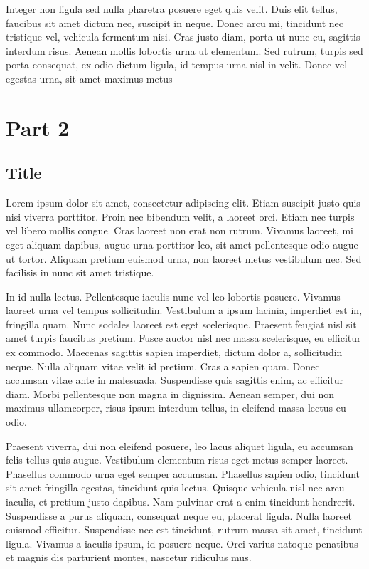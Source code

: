 \documentclass[
  a5paper,
  smalldemyvopaper,10pt,twoside,onecolumn,openright,extrafontsizes,hidelinks]{memoir}
\begin{document}
Integer non ligula sed nulla pharetra posuere eget quis velit. Duis elit
tellus, faucibus sit amet dictum nec, suscipit in neque. Donec arcu mi,
tincidunt nec tristique vel, vehicula fermentum nisi. Cras justo diam,
porta ut nunc eu, sagittis interdum risus. Aenean mollis lobortis urna
ut elementum. Sed rutrum, turpis sed porta consequat, ex odio dictum
ligula, id tempus urna nisl in velit. Donec vel egestas urna, sit amet
maximus metus

\part{Part 2}

\chapter{Title}\label{title-3}

Lorem ipsum dolor sit amet, consectetur adipiscing elit. Etiam suscipit
justo quis nisi viverra porttitor. Proin nec bibendum velit, a laoreet
orci. Etiam nec turpis vel libero mollis congue. Cras laoreet non erat
non rutrum. Vivamus laoreet, mi eget aliquam dapibus, augue urna
porttitor leo, sit amet pellentesque odio augue ut tortor. Aliquam
pretium euismod urna, non laoreet metus vestibulum nec. Sed facilisis in
nunc sit amet tristique.

In id nulla lectus. Pellentesque iaculis nunc vel leo lobortis posuere.
Vivamus laoreet urna vel tempus sollicitudin. Vestibulum a ipsum
lacinia, imperdiet est in, fringilla quam. Nunc sodales laoreet est eget
scelerisque. Praesent feugiat nisl sit amet turpis faucibus pretium.
Fusce auctor nisl nec massa scelerisque, eu efficitur ex commodo.
Maecenas sagittis sapien imperdiet, dictum dolor a, sollicitudin neque.
Nulla aliquam vitae velit id pretium. Cras a sapien quam. Donec accumsan
vitae ante in malesuada. Suspendisse quis sagittis enim, ac efficitur
diam. Morbi pellentesque non magna in dignissim. Aenean semper, dui non
maximus ullamcorper, risus ipsum interdum tellus, in eleifend massa
lectus eu odio.

Praesent viverra, dui non eleifend posuere, leo lacus aliquet ligula, eu
accumsan felis tellus quis augue. Vestibulum elementum risus eget metus
semper laoreet. Phasellus commodo urna eget semper accumsan. Phasellus
sapien odio, tincidunt sit amet fringilla egestas, tincidunt quis
lectus. Quisque vehicula nisl nec arcu iaculis, et pretium justo
dapibus. Nam pulvinar erat a enim tincidunt hendrerit. Suspendisse a
purus aliquam, consequat neque eu, placerat ligula. Nulla laoreet
euismod efficitur. Suspendisse nec est tincidunt, rutrum massa sit amet,
tincidunt ligula. Vivamus a iaculis ipsum, id posuere neque. Orci varius
natoque penatibus et magnis dis parturient montes, nascetur ridiculus
mus.
\end{document}
